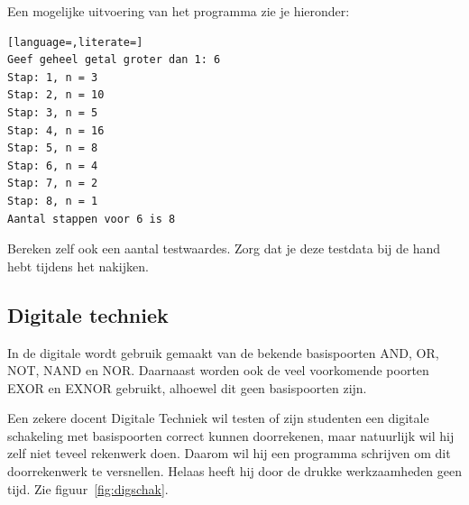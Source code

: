 \documentclass[a4paper,10pt,fleqn,twoside]{article}
\begin{document}
Een mogelijke uitvoering van het programma zie je hieronder:

\begin{lstlisting}[language=,literate=]
Geef geheel getal groter dan 1: 6
Stap: 1, n = 3
Stap: 2, n = 10
Stap: 3, n = 5
Stap: 4, n = 16
Stap: 5, n = 8
Stap: 6, n = 4
Stap: 7, n = 2
Stap: 8, n = 1
Aantal stappen voor 6 is 8
\end{lstlisting}

Bereken zelf ook een aantal testwaardes. Zorg dat je deze testdata bij de hand hebt tijdens het nakijken.

\subsection{Digitale techniek}
In de digitale wordt gebruik gemaakt van de bekende basispoorten AND, OR, NOT, NAND en NOR. Daarnaast worden ook de veel voorkomende poorten EXOR en EXNOR gebruikt, alhoewel dit geen basispoorten zijn.

Een zekere docent Digitale Techniek wil testen of zijn studenten een digitale schakeling met basispoorten correct kunnen doorrekenen, maar natuurlijk wil hij zelf niet teveel rekenwerk doen. Daarom wil hij een programma schrijven om dit doorrekenwerk te versnellen. Helaas heeft hij door de drukke werkzaamheden geen tijd. 
Zie figuur~\ref{fig:digschak}.
\end{document}
